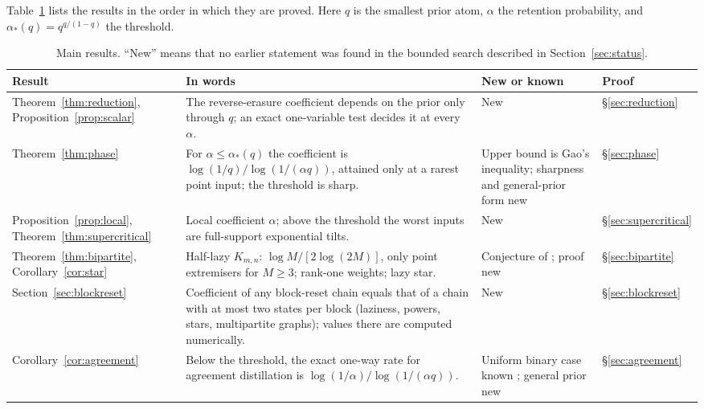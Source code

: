 \documentclass[11pt,a4paper]{article}
\numberwithin{equation}{section}
\theoremstyle{definition}
\theoremstyle{remark}
\newcommand{\ac}{\alpha_*}
\begin{document}
Table~\ref{tab:glance} lists the results in the order in which they are
proved. Here \(q\) is the smallest prior atom, \(\alpha\) the retention
probability, and \(\ac(q)=q^{q/(1-q)}\) the threshold.

\begin{table}[htbp]
\centering
\small
\renewcommand{\arraystretch}{1.25}
\begin{tabularx}{\linewidth}{@{}>{\raggedright\arraybackslash}p{2.55cm}X>{\raggedright\arraybackslash}p{2.75cm}l@{}}
\toprule
Result & In words & New or known & Proof\\
\midrule
Theorem~\ref{thm:reduction}, Proposition~\ref{prop:scalar} &
The reverse-erasure coefficient depends on the prior only through \(q\);
an exact one-variable test decides it at every \(\alpha\). &
New & \S\ref{sec:reduction}\\
Theorem~\ref{thm:phase} &
For \(\alpha\le\ac(q)\) the coefficient is
\(\log(1/q)/\log(1/(\alpha q))\), attained only at a rarest point input;
the threshold is sharp. &
Upper bound is Gao's inequality; sharpness and general-prior form new &
\S\ref{sec:phase}\\
Proposition~\ref{prop:local}, Theorem~\ref{thm:supercritical} &
Local coefficient \(\alpha\); above the threshold the worst inputs are
full-support exponential tilts. & New & \S\ref{sec:supercritical}\\
Theorem~\ref{thm:bipartite}, Corollary~\ref{cor:star} &
Half-lazy \(K_{m,n}\): \(\log M/[2\log(2M)]\), only point extremisers for
\(M\ge3\); rank-one weights; lazy star. &
Conjecture of \cite{caputo}; proof new & \S\ref{sec:bipartite}\\
Section~\ref{sec:blockreset} &
Coefficient of any block-reset chain equals that of a chain with at most
two states per block (laziness, powers, stars, multipartite graphs); values
there are computed numerically. & New & \S\ref{sec:blockreset}\\
Corollary~\ref{cor:agreement} &
Below the threshold, the exact one-way rate for agreement distillation is
\(\log(1/\alpha)/\log(1/(\alpha q))\). &
Uniform binary case known \cite{zhao}; general prior new &
\S\ref{sec:agreement}\\
\bottomrule
\end{tabularx}
\caption{Main results. ``New'' means that no earlier statement was found in
the bounded search described in Section~\ref{sec:status}.}
\label{tab:glance}
\end{table}
\end{document}
